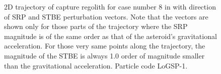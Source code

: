 \begin{figure}[htb]
\centering
\captionsetup{justification=centering}
\caption{2D trajectory of capture regolith for case number 8 in  with direction of \gls{SRP} and \gls{STBE} perturbation vectors. Note that the vectors are shown only for those parts of the trajectory where the \gls{SRP} magnitude is of the same order as that of the asteroid's gravitational acceleration. For those very same points along the trajectory, the magnitude of the \gls{STBE} is always 1.0 order of magnitude smaller than the gravitational acceleration. Particle code LoGSP-1.}
\label{fig:LoGSP_1_capture_case_8_2d_trajectory_perturbationVectors}
\end{figure}

